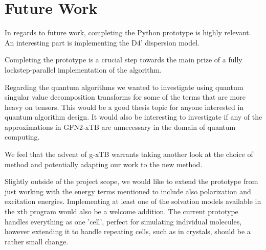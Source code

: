 \chapter{Future Work}\label{sec:future}
In regards to future work, completing the Python prototype is highly relevant. 
An interesting part is implementing the D4' dispersion model. 

Completing the prototype is a crucial step towards the main prize of a fully lockstep-parallel implementation of the algorithm. 

Regarding the quantum algorithms we wanted to investigate using quantum singular value decomposition transforms for some of the terms that are more heavy on tensors. This would be a good thesis topic for anyone interested in quantum algorithm design. It would also be interesting to investigate if any of the approximations in GFN2-xTB are unnecessary in the domain of quantum computing.

We feel that the advent of g-xTB warrants taking another look at the choice of method and potentially adapting our work to the new method. 

Slightly outside of the project scope, we would like to extend the prototype from just working with the energy terms mentioned to include also polarization and excitation energies. Implementing at least one of the solvation models available in the xtb program would also be a welcome addition. The current prototype handles everything as one 'cell', perfect for simulating individual molecules, however extending it to handle repeating cells, such as in crystals, should be a rather small change. 

